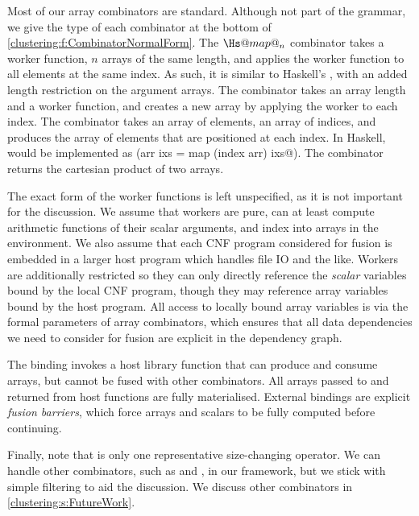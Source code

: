 Most of our array combinators are standard.
Although not part of the grammar, we give the type of each combinator at the bottom of \cref{clustering:f:CombinatorNormalForm}.
The $\Hs@map@_n$ combinator takes a worker function, $n$ arrays of the same length, and applies the worker function to all elements at the same index.
As such, it is similar to Haskell's \Hs@zipWith@, with an added length restriction on the argument arrays.
The \Hs@generate@ combinator takes an array length and a worker function, and creates a new array by applying the worker to each index.
The \Hs@gather@ combinator takes an array of elements, an array of indices, and produces the array of elements that are positioned at each index.
In Haskell, \Hs@gather@ would be implemented as (\Hs@gather arr ixs = map (index arr) ixs@).
The \Hs@cross@ combinator returns the cartesian product of two arrays. 

The exact form of the worker functions is left unspecified, as it is not important for the discussion.
We assume that workers are pure, can at least compute arithmetic functions of their scalar arguments, and index into arrays in the environment.
We also assume that each CNF program considered for fusion is embedded in a larger host program which handles file IO and the like.
Workers are additionally restricted so they can only directly reference the \emph{scalar} variables bound by the local CNF program, though they may reference array variables bound by the host program.
All access to locally bound array variables is via the formal parameters of array combinators, which ensures that all data dependencies we need to consider for fusion are explicit in the dependency graph.

The \Hs@external@ binding invokes a host library function that can produce and consume arrays, but cannot be fused with other combinators.
All arrays passed to and returned from host functions are fully materialised.
External bindings are explicit \emph{fusion barriers}, which force arrays and scalars to be fully computed before continuing. 

Finally, note that \Hs@filter@ is only one representative size-changing operator.
We can handle other combinators, such as \Hs@unfold@ and \Hs@slice@, in our framework, but we stick with simple filtering to aid the discussion.
We discuss other combinators in \cref{clustering:s:FutureWork}.

